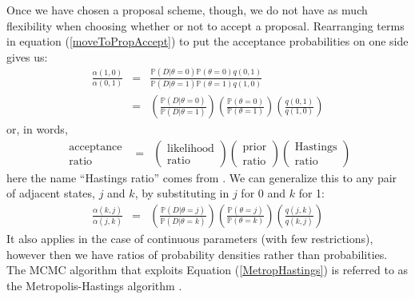 \documentclass[11pt]{article}
\newcommand{\prop}[2]{q(#1,#2)}
\newcommand{\accept}[2]{\alpha({#1,#2})}
\renewcommand{\Pr}{{\mathbb P}}
\begin{document}
Once we have chosen a proposal scheme, though, we do not have as much flexibility when choosing whether or not to accept a proposal.
Rearranging terms in equation (\ref{moveToPropAccept}) to put the acceptance probabilities on one side gives us:
\begin{eqnarray*}
	 \frac{\accept{1}{0}}{\accept{0}{1}} &  = & \frac{\Pr(D|\theta=0)\Pr(\theta=0)\prop{0}{1}}{\Pr(D|\theta=1)\Pr(\theta=1)\prop{1}{0}} \\
	 	& = & \left(\frac{\Pr(D|\theta=0)}{\Pr(D|\theta=1)}\right)\left(\frac{\Pr(\theta=0)}{\Pr(\theta=1)}\right)\left(\frac{\prop{0}{1}}{\prop{1}{0}}\right) \label{MetropHastings}
\end{eqnarray*}
or, in words,
\begin{eqnarray}
	\begin{array}{c} \mbox{acceptance} \\ \mbox{ratio} \end{array} & = & 
		\left(\begin{array}{c} {\mbox{likelihood}} \\ {\mbox{ratio}} \end{array}\right)
		\left(\begin{array}{c} {\mbox{prior}} \\ {\mbox{ratio}} \end{array}\right)
		\left(\begin{array}{c} {\mbox{Hastings}} \\ {\mbox{ratio}} \end{array}\right)
\end{eqnarray}
here the name ``Hastings ratio'' comes from \citet{Hastings1970}.
We can generalize this to any pair of adjacent states, $j$ and $k$, by substituting in $j$ for 0 and $k$ for 1:
\begin{eqnarray}
	 \frac{\accept{k}{j}}{\accept{j}{k}} & = & \left(\frac{\Pr(D|\theta=j)}{\Pr(D|\theta=k)}\right)\left(\frac{\Pr(\theta=j)}{\Pr(\theta=k)}\right)\left(\frac{\prop{j}{k}}{\prop{k}{j}}\right) \label{MetropHastings}
\end{eqnarray}
It also applies in the case of continuous parameters (with few restrictions), however then we have ratios of probability densities rather than probabilities.
The MCMC algorithm that exploits Equation (\ref{MetropHastings}) is referred to as the Metropolis-Hastings algorithm \citep{MetropolisRRTT1953}.
\end{document}
